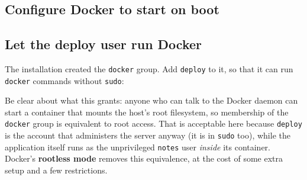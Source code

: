 \subsection*{Configure Docker to start on boot}\label{21-system-setup:configure-docker-to-start-on-boot}

\begin{codebox}[short]

\begin{Shaded}
\begin{Highlighting}[]


\end{Highlighting}
\end{Shaded}

\end{codebox}

\subsection*{Let the deploy user run Docker}\label{21-system-setup:let-the-deploy-user-run-docker}

The installation created the \texttt{docker} group. Add \texttt{deploy} to it, so that it can run \texttt{docker} commands without \texttt{sudo}:

\begin{codebox}[short]

\begin{Shaded}
\begin{Highlighting}[]
 
\end{Highlighting}
\end{Shaded}

\end{codebox}

\noindent{}Be clear about what this grants: anyone who can talk to the Docker daemon can start a container that mounts the host's root filesystem, so membership of the \texttt{docker} group is equivalent to root access. That is acceptable here because \texttt{deploy} is the account that administers the server anyway (it is in \texttt{sudo} too), while the application itself runs as the unprivileged \texttt{notes} user \emph{inside} its container. Docker's \textbf{rootless mode} removes this equivalence, at the cost of some extra setup and a few restrictions.

